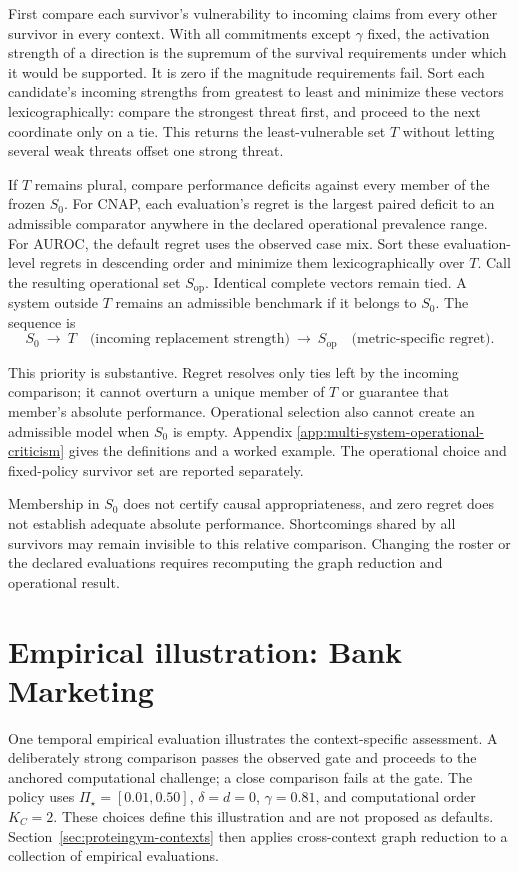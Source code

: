 \documentclass[11pt]{article}
\newcommand{\PSet}{\Pi_\star}
\theoremstyle{remark}
\begin{document}
First compare each survivor's vulnerability to incoming claims from every
other survivor in every context. With all commitments except $\gamma$ fixed,
the activation strength of a direction is the supremum of the survival
requirements under which it would be supported. It is zero if the magnitude
requirements fail. Sort each candidate's incoming strengths from greatest to
least and minimize these vectors lexicographically: compare the strongest
threat first, and proceed to the next coordinate only on a tie. This returns
the least-vulnerable set $T$ without letting several weak threats offset one
strong threat.

If $T$ remains plural, compare performance deficits against every member of
the frozen $S_0$. For CNAP, each evaluation's regret is the largest paired
deficit to an admissible comparator anywhere in the declared operational
prevalence range. For AUROC, the default regret uses the observed case mix.
Sort these evaluation-level regrets in descending order and minimize them
lexicographically over $T$. Call the resulting operational set
$S_{\mathrm{op}}$. Identical complete vectors remain tied. A system outside
$T$ remains an admissible benchmark if it belongs to $S_0$. The sequence is
\[
S_0
\ \longrightarrow\ 
T\quad\text{(incoming replacement strength)}
\ \longrightarrow\ 
S_{\mathrm{op}}\quad\text{(metric-specific regret)}.
\]

This priority is substantive. Regret resolves only ties left by the incoming
comparison; it cannot overturn a unique member of $T$ or guarantee that
member's absolute performance. Operational selection also cannot create an
admissible model when $S_0$ is empty. Appendix
\ref{app:multi-system-operational-criticism} gives the definitions and a worked
example. The operational choice and fixed-policy survivor set are reported
separately.

Membership in $S_0$ does not certify causal appropriateness, and zero regret
does not establish adequate absolute performance. Shortcomings shared by all
survivors may remain invisible to this relative comparison. Changing the
roster or the declared evaluations requires recomputing the graph reduction
and operational result.

\section{Empirical illustration: Bank Marketing}
\label{sec:illustrations}

One temporal empirical evaluation illustrates the context-specific assessment.
A deliberately strong comparison passes the observed gate and proceeds to the
anchored computational challenge; a close comparison fails at the gate. The
policy uses $\PSet=[0.01,0.50]$, $\delta=d=0$, $\gamma=0.81$, and
computational order $K_C=2$. These choices define this illustration and are
not proposed as defaults. Section~\ref{sec:proteingym-contexts} then applies
cross-context graph reduction to a collection of empirical evaluations.
\end{document}
